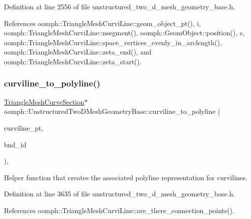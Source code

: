 Definition at line 2556 of file unstructured\+\_\+two\+\_\+d\+\_\+mesh\+\_\+geometry\+\_\+base.\+h.



References oomph\+::\+Triangle\+Mesh\+Curvi\+Line\+::geom\+\_\+object\+\_\+pt(), i, oomph\+::\+Triangle\+Mesh\+Curvi\+Line\+::nsegment(), oomph\+::\+Geom\+Object\+::position(), s, oomph\+::\+Triangle\+Mesh\+Curvi\+Line\+::space\+\_\+vertices\+\_\+evenly\+\_\+in\+\_\+arclength(), oomph\+::\+Triangle\+Mesh\+Curvi\+Line\+::zeta\+\_\+end(), and oomph\+::\+Triangle\+Mesh\+Curvi\+Line\+::zeta\+\_\+start().

\mbox{\label{classoomph_1_1UnstructuredTwoDMeshGeometryBase_ae0287b88002273bb17ebcc5b3a25776a}} 
\subsubsection{\texorpdfstring{curviline\+\_\+to\+\_\+polyline()}{curviline\_to\_polyline()}}
{\footnotesize\ttfamily \hyperlink{classoomph_1_1TriangleMeshCurveSection}{Triangle\+Mesh\+Curve\+Section}$\ast$ oomph\+::\+Unstructured\+Two\+D\+Mesh\+Geometry\+Base\+::curviline\+\_\+to\+\_\+polyline (\begin{DoxyParamCaption}\item[{\hyperlink{classoomph_1_1TriangleMeshCurviLine}{Triangle\+Mesh\+Curvi\+Line} $\ast$\&}]{curviline\+\_\+pt,  }\item[{unsigned \&}]{bnd\+\_\+id }\end{DoxyParamCaption})\hspace{0.3cm}{\ttfamily [inline]}, {\ttfamily [private]}}



Helper function that creates the associated polyline representation for curvilines. 



Definition at line 3635 of file unstructured\+\_\+two\+\_\+d\+\_\+mesh\+\_\+geometry\+\_\+base.\+h.



References oomph\+::\+Triangle\+Mesh\+Curvi\+Line\+::are\+\_\+there\+\_\+connection\+\_\+points().

